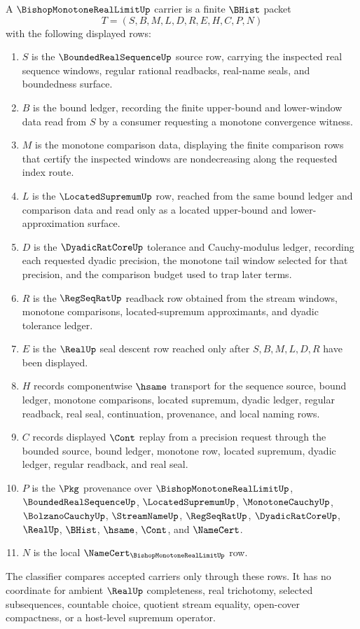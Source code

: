\begin{definition}
\label{def:bishop-monotone-real-limit-carrier}
A $\BishopMonotoneRealLimitUp$ carrier is a finite $\BHist$ packet
$$
T=(S,B,M,L,D,R,E,H,C,P,N)
$$
with the following displayed rows:
\begin{enumerate}
\item $S$ is the $\BoundedRealSequenceUp$ source row, carrying the inspected real sequence windows, regular rational readbacks, real-name seals, and boundedness surface.
\item $B$ is the bound ledger, recording the finite upper-bound and lower-window data read from $S$ by a consumer requesting a monotone convergence witness.
\item $M$ is the monotone comparison data, displaying the finite comparison rows that certify the inspected windows are nondecreasing along the requested index route.
\item $L$ is the $\LocatedSupremumUp$ row, reached from the same bound ledger and comparison data and read only as a located upper-bound and lower-approximation surface.
\item $D$ is the $\DyadicRatCoreUp$ tolerance and Cauchy-modulus ledger, recording each requested dyadic precision, the monotone tail window selected for that precision, and the comparison budget used to trap later terms.
\item $R$ is the $\RegSeqRatUp$ readback row obtained from the stream windows, monotone comparisons, located-supremum approximants, and dyadic tolerance ledger.
\item $E$ is the $\RealUp$ seal descent row reached only after $S,B,M,L,D,R$ have been displayed.
\item $H$ records componentwise $\hsame$ transport for the sequence source, bound ledger, monotone comparisons, located supremum, dyadic ledger, regular readback, real seal, continuation, provenance, and local naming rows.
\item $C$ records displayed $\Cont$ replay from a precision request through the bounded source, bound ledger, monotone row, located supremum, dyadic ledger, regular readback, and real seal.
\item $P$ is the $\Pkg$ provenance over $\BishopMonotoneRealLimitUp$, $\BoundedRealSequenceUp$, $\LocatedSupremumUp$, $\MonotoneCauchyUp$, $\BolzanoCauchyUp$, $\StreamNameUp$, $\RegSeqRatUp$, $\DyadicRatCoreUp$, $\RealUp$, $\BHist$, $\hsame$, $\Cont$, and $\NameCert$.
\item $N$ is the local $\NameCert_{\BishopMonotoneRealLimitUp}$ row.
\end{enumerate}
The classifier compares accepted carriers only through these rows. It has no coordinate for ambient $\RealUp$ completeness, real trichotomy, selected subsequences, countable choice, quotient stream equality, open-cover compactness, or a host-level supremum operator.
\end{definition}

